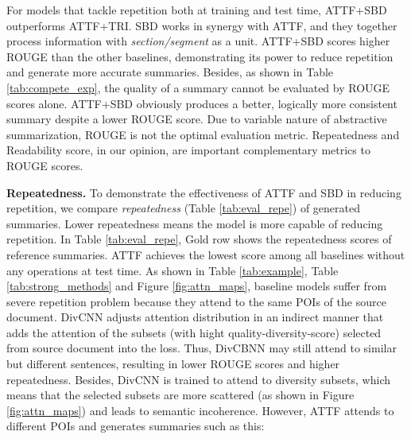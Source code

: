\documentclass{nle}
\theoremstyle{definition}
\newcommand{\figref}[1]{Figure \ref{#1}}
\newcommand{\tabref}[1]{Table \ref{#1}}
\begin{document}
For models that tackle repetition both at training and test time, 
ATTF+SBD outperforms ATTF+TRI.
SBD works in synergy with ATTF, and they together process 
information with \textit{section/segment} as a unit.
ATTF+SBD scores higher ROUGE than the other baselines, 
demonstrating its power to  reduce 
repetition and generate more accurate summaries.
Besides, as shown in \tabref{tab:compete_exp}, the quality of a summary cannot be evaluated by
ROUGE scores alone.
ATTF+SBD obviously produces a better, logically more consistent summary despite 
a lower ROUGE score.  
Due to variable nature of abstractive summarization, ROUGE is
not the optimal evaluation metric.
Repeatedness and Readability score, 
in our opinion, are important complementary metrics to ROUGE scores.  

\textbf{Repeatedness.}
To demonstrate the effectiveness of ATTF and SBD in reducing repetition, 
we compare \textit{repeatedness} (\tabref{tab:eval_repe}) 
of generated summaries.
Lower repeatedness 
means the model is more capable of reducing repetition.
In \tabref{tab:eval_repe}, Gold row shows the repeatedness scores of
reference summaries. ATTF achieves the lowest
score among all baselines without any operations at test time. 
As shown in \tabref{tab:example}, \tabref{tab:strong_methods} and \figref{fig:attn_maps},
baseline models suffer from severe repetition problem because they attend to the same POIs 
of the source document. DivCNN adjusts attention distribution in an indirect manner that adds the attention of the subsets (with hight quality-diversity-score) selected from source document into the loss. Thus, DivCBNN may still attend to similar but different sentences, resulting in lower ROUGE scores and higher repeatedness. 
Besides, DivCNN is trained to attend to diversity subsets, 
which means that the selected subsets are more scattered (as shown in \figref{fig:attn_maps}) and leads to semantic incoherence.
However, ATTF attends to different POIs and generates summaries 
such as this:

\end{document}
